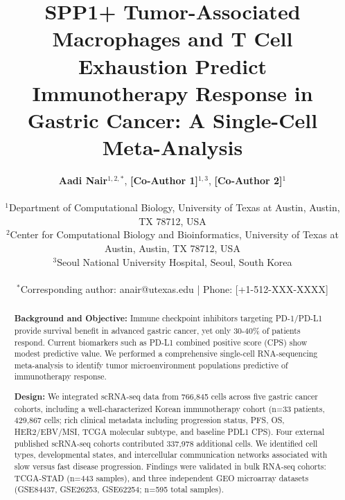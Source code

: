 \documentclass[12pt,twoside]{article}
\title{SPP1+ Tumor-Associated Macrophages and T Cell Exhaustion Predict Immunotherapy Response in Gastric Cancer: A Single-Cell Meta-Analysis}
\author{
    \textbf{Aadi Nair}$^{1,2,*}$,
    \textbf{[Co-Author 1]}$^{1,3}$,
    \textbf{[Co-Author 2]}$^{1}$ \\
    \\
    $^1$Department of Computational Biology, University of Texas at Austin, Austin, TX 78712, USA \\
    $^2$Center for Computational Biology and Bioinformatics, University of Texas at Austin, Austin, TX 78712, USA \\
    $^3$Seoul National University Hospital, Seoul, South Korea \\
    \\
    $^*$Corresponding author: anair@utexas.edu | Phone: [+1-512-XXX-XXXX]
}
\date{}
\begin{document}
\maketitle


\begin{abstract}

\noindent \textbf{Background and Objective:} Immune checkpoint inhibitors targeting PD-1/PD-L1 provide survival benefit in advanced gastric cancer, yet only 30-40\% of patients respond. Current biomarkers such as PD-L1 combined positive score (CPS) show modest predictive value. We performed a comprehensive single-cell RNA-sequencing meta-analysis to identify tumor microenvironment populations predictive of immunotherapy response.

\noindent \textbf{Design:} We integrated scRNA-seq data from 766,845 cells across five gastric cancer cohorts, including a well-characterized Korean immunotherapy cohort (n=33 patients, 429,867 cells; rich clinical metadata including progression status, PFS, OS, HER2/EBV/MSI, TCGA molecular subtype, and baseline PDL1 CPS). Four external published scRNA-seq cohorts contributed 337,978 additional cells. We identified cell types, developmental states, and intercellular communication networks associated with slow versus fast disease progression. Findings were validated in bulk RNA-seq cohorts: TCGA-STAD (n=443 samples), and three independent GEO microarray datasets (GSE84437, GSE26253, GSE62254; n=595 total samples).


\end{abstract}
\end{document}
